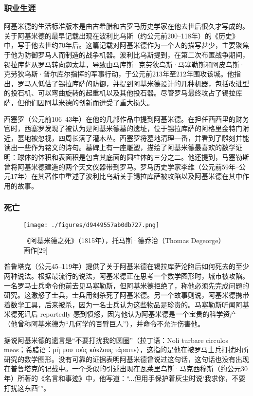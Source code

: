 \subsubsection{职业生涯}  
阿基米德的生活标准版本是由古希腊和古罗马历史学家在他去世后很久才写成的。关于阿基米德的最早记载出现在波利比乌斯（约公元前200–118年）的《历史》中，写于他去世约70年后。这篇记载对阿基米德作为一个人的描写甚少，主要聚焦于他为防御罗马人而制造的战争机器。波利比乌斯提到，在第二次布匿战争期间，锡拉库萨从罗马转向迦太基，导致由马库斯·克劳狄乌斯·马塞勒斯和阿皮乌斯·克劳狄乌斯·普尔库尔指挥的军事行动，于公元前213年至212年围攻该城。他指出，罗马人低估了锡拉库萨的防御，并提到阿基米德设计的几种机器，包括改进型的投石机、可以弯曲旋转的起重机以及其他投石器。尽管罗马最终攻占了锡拉库萨，但他们因阿基米德的创新而遭受了重大损失。

西塞罗（公元前106–43年）在他的几部作品中提到阿基米德。在担任西西里的财务官时，西塞罗发现了被认为是阿基米德墓的遗址，位于锡拉库萨的阿格里金特门附近，墓地被忽视，四周长满了灌木丛。西塞罗将墓地清理一番，并看到了雕刻并能读出一些作为铭文的诗句。墓碑上有一座雕塑，描绘了阿基米德最喜欢的数学证明：球体的体积和表面积是包含其底面的圆柱体的三分之二。他还提到，马塞勒斯曾将阿基米德建造的两个天文仪器带到罗马。罗马历史学家李维（公元前59年–公元17年）在其著作中重述了波利比乌斯关于锡拉库萨被攻陷以及阿基米德在其中作用的故事。
\subsubsection{死亡}
\begin{figure}[ht]
\centering
\texttt{[image: ./figures/d9449557ab0db727.png]}
\caption{《阿基米德之死》（1815年），托马斯·德乔治（Thomas Degeorge）画作[29]} \label{fig_Archim_2}
\end{figure}
普鲁塔克（公元45–119年）提供了关于阿基米德在锡拉库萨沦陷后如何死去的至少两种说法。根据最流行的说法，阿基米德正在思考一个数学图形时，城市被攻陷。一名罗马士兵命令他前去见马塞勒斯，但阿基米德拒绝了，称他必须先完成问题的研究。这激怒了士兵，士兵用剑杀死了阿基米德。另一个故事则说，阿基米德携带着数学工具，后来被杀，因为一名士兵认为这些物品是珍贵的。马塞勒斯听闻阿基米德死讯后 reportedly 感到愤怒，因为他认为阿基米德是一个宝贵的科学资产（他曾称阿基米德为“几何学的百臂巨人”），并命令不允许伤害他。

据说阿基米德的遗言是“不要打扰我的圆圈”（拉丁语：Noli turbare circulos meos；希腊语：μὴ μου τοὺς κύκλους τάραττε），这指的是他在被罗马士兵打扰时所研究的数学图形。没有可靠的证据表明阿基米德曾说过这句话，这句话也没有出现在普鲁塔克的记载中。一个类似的引述出现在瓦莱里乌斯·马克西穆斯（约公元30年）所著的《名言和事迹》中，他写道：“...但用手保护着灰尘时说‘我求你，不要打扰这东西’”。
